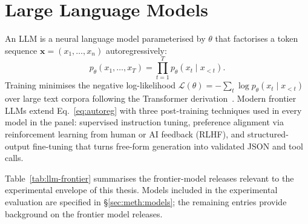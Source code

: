 \section{Large Language Models}\label{sec:lit:llm-background}

An LLM is a neural language model parameterised by $\theta$ that factorises a token
sequence $\mathbf{x} = (x_1,\dots,x_n)$ autoregressively:
%
\begin{equation}\label{eq:autoreg}
  p_\theta(x_1,\dots,x_T) = \prod_{t=1}^{T} p_\theta(x_t \mid x_{<t}).
\end{equation}
%
Training minimises the negative log-likelihood
$\mathcal{L}(\theta) = -\sum_{t} \log p_\theta(x_t \mid x_{<t})$
over large text corpora following the Transformer
derivation~\cite{devlin2019bert}. Modern frontier LLMs extend Eq.~\eqref{eq:autoreg}
with three post-training techniques used in every model in the panel: supervised
instruction tuning, preference alignment via reinforcement learning from human or AI
feedback (RLHF), and structured-output fine-tuning that turns free-form generation
into validated JSON and tool calls.

Table~\ref{tab:llm-frontier} summarises the frontier-model releases relevant
to the experimental envelope of this thesis. Models included in the
experimental evaluation are specified in §\ref{sec:meth:models}; the remaining
entries provide background on the frontier model releases.

